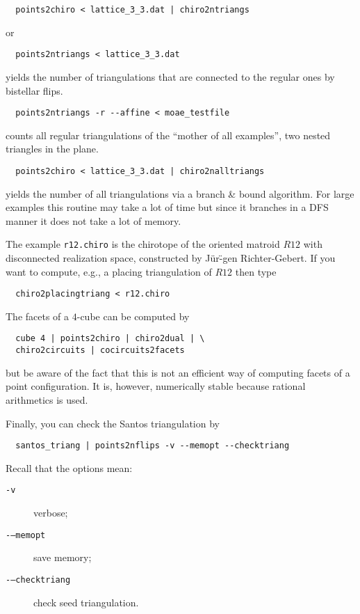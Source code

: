 \documentclass[12pt,a4paper]{article}
\begin{document}
\begin{verbatim}
  points2chiro < lattice_3_3.dat | chiro2ntriangs
\end{verbatim}

or 

\begin{verbatim}
  points2ntriangs < lattice_3_3.dat
\end{verbatim}

yields the number of triangulations that are connected to the regular ones by
bistellar flips.

\begin{verbatim}
  points2ntriangs -r --affine < moae_testfile
\end{verbatim}
counts all regular triangulations of the ``mother of all examples'', two nested 
triangles in the plane.

\begin{verbatim}
  points2chiro < lattice_3_3.dat | chiro2nalltriangs
\end{verbatim}

yields the number of all triangulations via a branch \& bound algorithm.
For large examples this routine may take a lot of time but since it branches in
a DFS manner it does not take a lot of memory.

The example \texttt{r12.chiro} is the chirotope of the oriented matroid $R12$
with disconnected realization space, constructed by J\"ur\"-gen
Richter-Gebert.  If you want to compute, e.g., a placing triangulation of $R12$
then type

\begin{verbatim}
  chiro2placingtriang < r12.chiro
\end{verbatim}

The facets of a $4$-cube can be computed by

\begin{verbatim}
  cube 4 | points2chiro | chiro2dual | \
  chiro2circuits | cocircuits2facets
\end{verbatim}

but be aware of the fact that this is not an efficient way of computing facets
of a point configuration.  It is, however, numerically stable because rational
arithmetics is used.

Finally, you can check the Santos triangulation by

\begin{verbatim}
  santos_triang | points2nflips -v --memopt --checktriang
\end{verbatim}

Recall that the options mean:

\begin{description}
\item[\texttt{-v}] verbose;
\item[\texttt{-}\texttt{--memopt}] save memory;
\item[\texttt{-}\texttt{--checktriang}] check seed triangulation.
\end{description}
\end{document}
